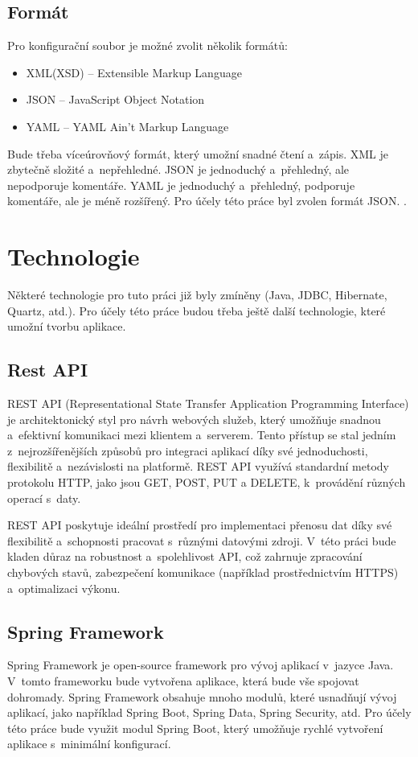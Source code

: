 \documentclass[czech, kiv, ba, he, iso690numb, pdf]{fasthesis}
\begin{document}
\section{Formát}
Pro konfigurační soubor je možné zvolit několik formátů:
\begin{itemize}
    \item XML(XSD) -- Extensible Markup Language
    \item JSON -- JavaScript Object Notation
    \item YAML -- YAML Ain't Markup Language
\end{itemize}
Bude třeba víceúrovňový formát, který umožní snadné čtení a~zápis.
XML je zbytečně složité a~nepřehledné.
JSON je jednoduchý a~přehledný, ale nepodporuje komentáře.
YAML je jednoduchý a~přehledný, podporuje komentáře, ale je méně rozšířený.
Pro účely této práce byl zvolen formát JSON. \cite{cisco_xml_json_yaml}.

\chapter{Technologie}
Některé technologie pro tuto práci již byly zmíněny (Java, JDBC, Hibernate, Quartz, atd.).
Pro účely této práce budou třeba ještě další technologie, které umožní tvorbu aplikace.

\section{Rest API}
REST API (Representational State Transfer Application Programming Interface) je architektonický 
styl pro návrh webových služeb, který umožňuje snadnou a~efektivní komunikaci mezi klientem a~serverem. 
Tento přístup se stal jedním z~nejrozšířenějších způsobů pro integraci aplikací díky své jednoduchosti, 
flexibilitě a~nezávislosti na platformě. REST API využívá standardní metody protokolu HTTP, jako jsou 
GET, POST, PUT a DELETE, k~provádění různých operací s~daty.

REST API poskytuje ideální prostředí pro implementaci přenosu dat díky své flexibilitě a~schopnosti 
pracovat s~různými datovými zdroji. V~této práci bude kladen důraz na robustnost a~spolehlivost API, 
což zahrnuje zpracování chybových stavů, zabezpečení komunikace (například prostřednictvím HTTPS) 
a~optimalizaci výkonu.
\cite{rest_api}

\section{Spring Framework}
Spring Framework je open-source framework pro vývoj aplikací v~jazyce Java.
V~tomto frameworku bude vytvořena aplikace, která bude vše spojovat dohromady.
Spring Framework obsahuje mnoho modulů, které usnadňují vývoj aplikací, 
jako například Spring Boot, Spring Data, Spring Security, atd.
Pro účely této práce bude využit modul Spring Boot, který umožňuje rychlé 
vytvoření aplikace s~minimální konfigurací.
\cite{spring_framework}
\end{document}
